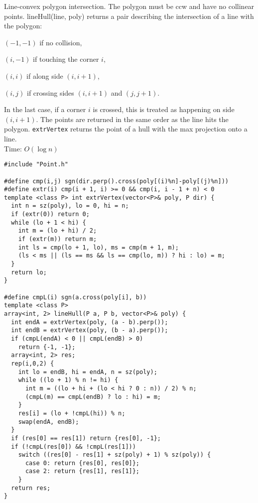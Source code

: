 Line-convex polygon intersection. The polygon must be ccw and have no collinear points.
lineHull(line, poly) returns a pair describing the intersection of a line with the polygon:
\begin{itemize*}
\item $(-1, -1)$ if no collision,
\item $(i, -1)$ if touching the corner $i$,
\item $(i, i)$ if along side $(i, i+1)$,
\item $(i, j)$ if crossing sides $(i, i+1)$ and $(j, j+1)$.
\end{itemize*}
In the last case, if a corner $i$ is crossed, this is treated as happening on side $(i, i+1)$.
The points are returned in the same order as the line hits the polygon.
\texttt{extrVertex} returns the point of a hull with the max projection onto a line.\\
Time: $O(\log n)$
\begin{verbatim}
#include "Point.h"

#define cmp(i,j) sgn(dir.perp().cross(poly[(i)%n]-poly[(j)%n]))
#define extr(i) cmp(i + 1, i) >= 0 && cmp(i, i - 1 + n) < 0
template <class P> int extrVertex(vector<P>& poly, P dir) {
  int n = sz(poly), lo = 0, hi = n;
  if (extr(0)) return 0;
  while (lo + 1 < hi) {
    int m = (lo + hi) / 2;
    if (extr(m)) return m;
    int ls = cmp(lo + 1, lo), ms = cmp(m + 1, m);
    (ls < ms || (ls == ms && ls == cmp(lo, m)) ? hi : lo) = m;
  }
  return lo;
}

#define cmpL(i) sgn(a.cross(poly[i], b))
template <class P>
array<int, 2> lineHull(P a, P b, vector<P>& poly) {
  int endA = extrVertex(poly, (a - b).perp());
  int endB = extrVertex(poly, (b - a).perp());
  if (cmpL(endA) < 0 || cmpL(endB) > 0)
    return {-1, -1};
  array<int, 2> res;
  rep(i,0,2) {
    int lo = endB, hi = endA, n = sz(poly);
    while ((lo + 1) % n != hi) {
      int m = ((lo + hi + (lo < hi ? 0 : n)) / 2) % n;
      (cmpL(m) == cmpL(endB) ? lo : hi) = m;
    }
    res[i] = (lo + !cmpL(hi)) % n;
    swap(endA, endB);
  }
  if (res[0] == res[1]) return {res[0], -1};
  if (!cmpL(res[0]) && !cmpL(res[1]))
    switch ((res[0] - res[1] + sz(poly) + 1) % sz(poly)) {
      case 0: return {res[0], res[0]};
      case 2: return {res[1], res[1]};
    }
  return res;
}
\end{verbatim}
